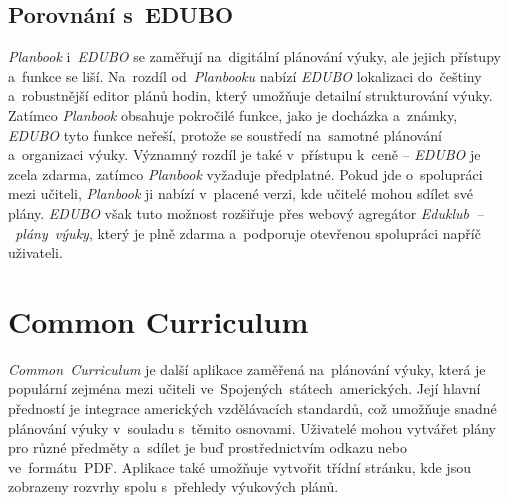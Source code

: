 \documentclass[male,czech,api_bc]{kitheses}
\begin{document}
\subsection{Porovnání s~EDUBO}  
\textit{Planbook} i~\textit{EDUBO} se zaměřují na~digitální plánování výuky, ale jejich přístupy a~funkce se liší. Na~rozdíl od~\textit{Planbooku} nabízí \textit{EDUBO} lokalizaci do~češtiny a~robustnější editor plánů hodin, který umožňuje detailní strukturování výuky. Zatímco \textit{Planbook} obsahuje pokročilé funkce, jako je docházka a~známky, \textit{EDUBO} tyto funkce neřeší, protože se soustředí na~samotné plánování a~organizaci výuky. Významný rozdíl je také v~přístupu k~ceně – \textit{EDUBO} je zcela zdarma, zatímco \textit{Planbook} vyžaduje předplatné. Pokud jde o~spolupráci mezi učiteli, \textit{Planbook} ji nabízí v~placené verzi, kde učitelé mohou sdílet své plány. \textit{EDUBO} však tuto možnost rozšiřuje přes webový agregátor \textit{Eduklub~–~plány~výuky}, který je plně zdarma a~podporuje otevřenou spolupráci napříč uživateli.

\section{Common Curriculum}

\textit{Common~Curriculum} je další aplikace zaměřená na~plánování výuky, která je populární zejména mezi učiteli ve~Spojených~státech~amerických. Její hlavní předností je integrace amerických vzdělávacích standardů, což umožňuje snadné plánování výuky v~souladu s~těmito osnovami. Uživatelé mohou vytvářet plány pro různé předměty a~sdílet je buď prostřednictvím odkazu nebo ve~formátu~PDF. Aplikace také umožňuje vytvořit třídní stránku, kde jsou zobrazeny rozvrhy spolu s~přehledy výukových plánů.
\end{document}
